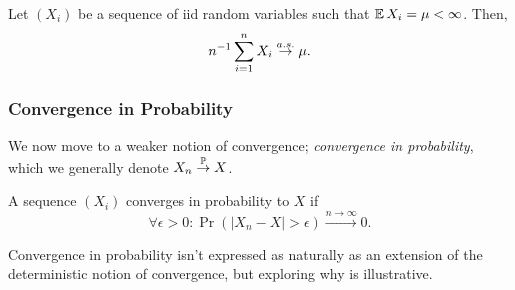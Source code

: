 \begin{theorem}
    Let $(X_i)$ be a sequence of iid random variables such that 
    $\operatorname*{\mathbb{E}} X_i = \mu < \infty$. Then,
    \[
        n^{-1} \sum_{i=1}^{n} X_i 
        \overset{a.s.}{\rightarrow}
        \mu.
    \]
\end{theorem}

\subsubsection{Convergence in Probability}

We now move to a weaker notion of convergence; \emph{convergence in probability},
which we generally denote $X_n \overset{\operatorname*{\mathbb{P}}}{\rightarrow} X$.

\begin{definition}
    A sequence $(X_i)$ converges in probability to $X$ if 
    \[
        \forall \epsilon > 0:
        \Pr \left( |X_n - X| > \epsilon \right) \stackrel{n \rightarrow \infty}{\rightarrow} 0.
    \]
\end{definition}


Convergence in probability isn't expressed as naturally as an extension of the 
deterministic notion of convergence, but exploring why is illustrative.

